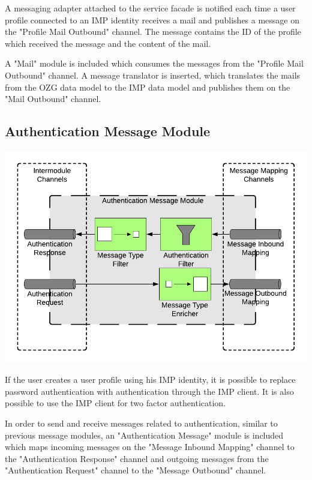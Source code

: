 A messaging adapter attached to the service facade is notified each time a user profile connected to an IMP identity receives a mail and publishes a message on the "Profile Mail Outbound" channel. The message contains the ID of the profile which received the message and the content of the mail.

A "Mail" module is included which consumes the messages from the "Profile Mail Outbound" channel. A message translator is inserted, which translates the mails from the OZG data model to the IMP data model and publishes them on the "Mail Outbound" channel.

\subsection{Authentication Message Module}

\begin{center}
    \includegraphics[scale=0.6]{Diagrams/Integration Architecture 1/Technological Integration/16. Authenticatin Message Module.pdf}
\end{center}

If the user creates a user profile using his IMP identity, it is possible to replace password authentication with authentication through the IMP client. It is also possible to use the IMP client for two factor authentication.

In order to send and receive messages related to authentication, similar to previous message modules, an "Authentication Message" module is included which maps incoming messages on the "Message Inbound Mapping" channel to the "Authentication Response" channel and outgoing messages from the "Authentication Request" channel to the "Message Outbound" channel.

